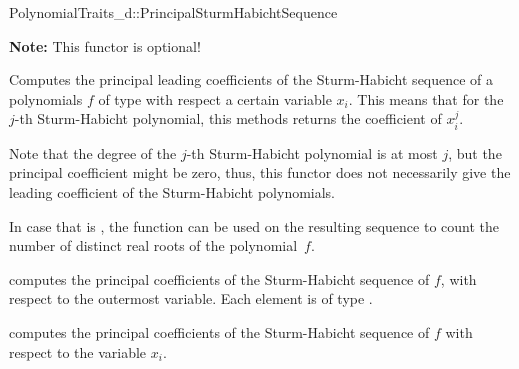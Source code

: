 \begin{ccRefConcept}{PolynomialTraits_d::PrincipalSturmHabichtSequence}

\textbf{Note:} This functor is optional!

\ccDefinition

Computes the principal leading coefficients of the Sturm-Habicht sequence 
of a polynomials $f$ of type  
with respect a certain variable $x_i$.
This means that for the $j$-th Sturm-Habicht polynomial, this methods returns
the coefficient of $x_i^j$. 

Note that the degree of the $j$-th Sturm-Habicht polynomial is at most $j$,
but the principal coefficient might be zero, thus, this functor does not
necessarily give the leading coefficient of the Sturm-Habicht polynomials.

In case that  is , the function  can be used
on the resulting sequence to count the number of distinct real roots of
the polynomial~$f$.


\ccOperations
{}
         { computes the principal coefficients of the 
           Sturm-Habicht sequence of $f$, 
           with respect to the outermost variable. Each element is of type
           .}

         { computes the principal coefficients 
           of the Sturm-Habicht sequence of $f$ 
           with respect to the variable $x_i$.}


\ccSeeAlso

\\
\\
\\
\\
\\
\\

\end{ccRefConcept}
